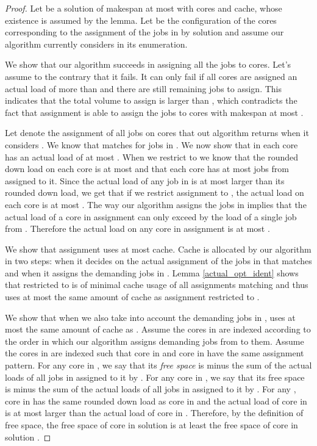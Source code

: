 \documentclass[11pt]{article}
\begin{document}
\begin{proof}
Let  be a solution of makespan at most  with  cores and  cache, whose existence is assumed by the lemma.
Let  be the configuration of the cores corresponding to the assignment of the jobs in  by solution  and assume our algorithm currently considers  in its enumeration.

We show that our algorithm succeeds in assigning all the jobs to  cores. Let's assume to the contrary that it fails. It can only fail if all cores are assigned an actual load of more than  and there are still remaining jobs to assign. This indicates that the total volume to assign is larger than , which contradicts the fact that assignment  is able to assign the jobs to  cores with makespan at most .

Let  denote the assignment of all jobs on  cores that out algorithm returns when it considers . 
We know that  matches   for jobs in .
We now show that in  each core has an actual load of at most .
When we restrict  to  we know that the rounded down load on each core is at most  and that each core has at most  jobs from  assigned to it.
Since the actual load of any job in  is at most  larger than its rounded down load, we get that if we restrict assignment  to , the actual load on each core is at most .
The way our algorithm assigns the jobs in  implies that the actual load of a core in assignment  can only exceed  by the load of a single job from . Therefore the actual load on any core in assignment  is at most .

We show that assignment  uses at most  cache.
Cache is allocated by our algorithm in two steps: when it decides on the actual assignment of the jobs in  that matches  and when it assigns the demanding jobs in .
Lemma \ref{actual_opt_ident} shows that  restricted to  is of minimal cache usage of all assignments matching  and thus uses at most the same amount of cache as assignment  restricted to .

We show that when we also take into account the demanding jobs in ,  uses at most the same amount of cache as .
Assume the cores in  are indexed according to the order in which our algorithm assigns demanding jobs from  to them.
Assume the cores in  are indexed such that core  in  and core  in  have the same assignment pattern.
For any core in , we say that its \textit{free space} is   minus the sum of the actual loads of all jobs in  assigned to it by .
For any core in , we say that its free space is  minus the sum of the actual loads of all jobs in  assigned to it by .
For any , core  in  has the same rounded down load as core  in  and the actual load of core  in  is at most  larger than the actual load of core  in . 
Therefore, by the definition of free space, the free space of core  in solution  is at least the free space of core  in solution .


\end{proof}
\end{document}
